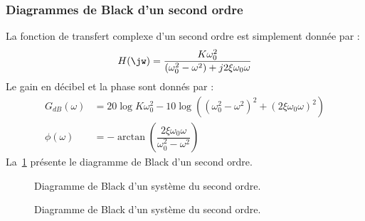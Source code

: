\subsubsection{Diagrammes de Black d'un second ordre}
La fonction de transfert complexe d'un second ordre est simplement donnée par :
\[
    H(\jw)=\dfrac{K\omega_0^2}{(\omega_0^2-\omega^2)+j2\xi\omega_0\omega}
\]
Le gain en décibel et la phase sont donnés par :
\begin{align*}
    G_{dB}(\omega)&=20\log{K\omega_0^2}-10
                    \log{\left((\omega_0^2-\omega^2)^2+
                               (2\xi\omega_0\omega)^2\right)} \\
      \phi(\omega)&=-\arctan{\left(\dfrac{2\xi\omega_0\omega}
                                         {\omega_0^2-\omega^2}\right)}
\end{align*}
La~\cref{fig-black_4} présente le diagramme de Black d'un second ordre.
\begin{figure}[!h]
    \centering
    
    \caption{Diagramme de Black d'un système du second ordre. 
    \label{fig-black_4}}
\end{figure}
\begin{figure}[!h]
    \centering
    
    \caption{Diagramme de Black d'un système du second ordre. 
    \label{fig-black_5}}
\end{figure}
\clearpage
\restoregeometry
\captionsetup{width=0.9\linewidth}
